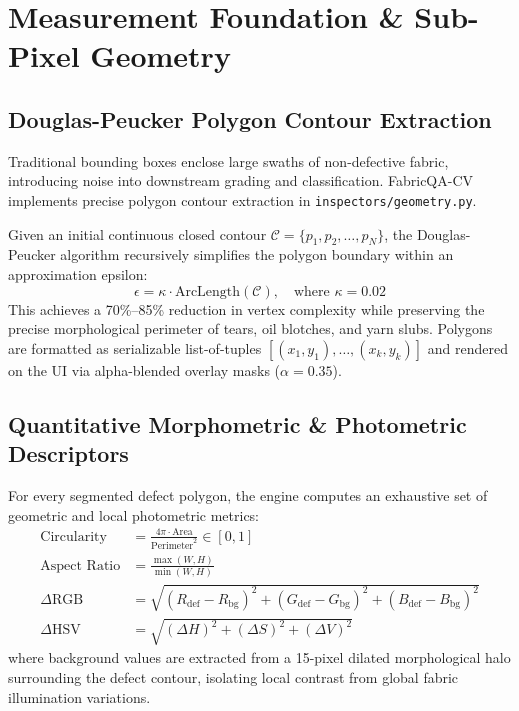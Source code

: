 \documentclass[10pt,a4paper]{article}
\begin{document}
\section{Measurement Foundation \& Sub-Pixel Geometry}

\subsection{Douglas-Peucker Polygon Contour Extraction}
Traditional bounding boxes enclose large swaths of non-defective fabric, introducing noise into downstream grading and classification. FabricQA-CV implements precise polygon contour extraction in \texttt{inspectors/geometry.py}. 

Given an initial continuous closed contour $\mathcal{C} = \{p_1, p_2, \dots, p_N\}$, the Douglas-Peucker algorithm recursively simplifies the polygon boundary within an approximation epsilon:
\begin{equation}
\epsilon = \kappa \cdot \text{ArcLength}(\mathcal{C}), \quad \text{where } \kappa = 0.02
\end{equation}
This achieves a 70\%--85\% reduction in vertex complexity while preserving the precise morphological perimeter of tears, oil blotches, and yarn slubs. Polygons are formatted as serializable list-of-tuples $[(x_1, y_1), \dots, (x_k, y_k)]$ and rendered on the UI via alpha-blended overlay masks ($\alpha = 0.35$).

\subsection{Quantitative Morphometric \& Photometric Descriptors}
For every segmented defect polygon, the engine computes an exhaustive set of geometric and local photometric metrics:
\begin{align}
\text{Circularity} &= \frac{4 \pi \cdot \text{Area}}{\text{Perimeter}^2} \in [0, 1] \\
\text{Aspect Ratio} &= \frac{\max(W, H)}{\min(W, H)} \\
\Delta\text{RGB} &= \sqrt{(R_{\text{def}} - R_{\text{bg}})^2 + (G_{\text{def}} - G_{\text{bg}})^2 + (B_{\text{def}} - B_{\text{bg}})^2} \\
\Delta\text{HSV} &= \sqrt{(\Delta H)^2 + (\Delta S)^2 + (\Delta V)^2}
\end{align}
where background values are extracted from a 15-pixel dilated morphological halo surrounding the defect contour, isolating local contrast from global fabric illumination variations.
\end{document}
